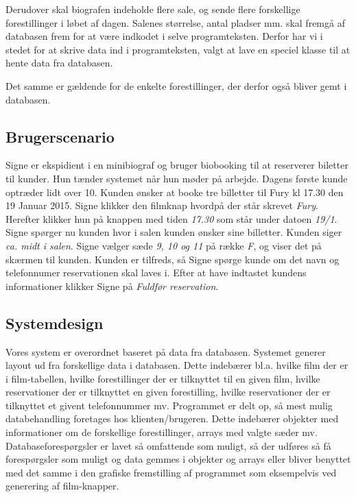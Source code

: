 \documentclass[final]{report}
\begin{document}
Derudover skal biografen indeholde flere sale, og sende flere forskellige forestillinger i løbet af dagen. Salenes størrelse, antal pladser mm. skal fremgå af databasen frem for at være indkodet i selve programteksten. Derfor har vi i stedet for at skrive data ind i programteksten, valgt at lave en speciel klasse til at hente data fra databasen. 

Det samme er gældende for de enkelte forestillinger, der derfor også bliver gemt i databasen.

\subsection{Brugerscenario}
Signe er ekspidient i en minibiograf og bruger biobooking til at reserverer biletter til kunder. Hun tænder systemet når hun møder på arbejde. Dagens første kunde optræder lidt over 10. Kunden ønsker at booke tre billetter til Fury kl 17.30 den 19 Januar 2015. Signe klikker den filmknap hvordpå der står skrevet \emph{Fury}. Herefter klikker hun på knappen med tiden \emph{17.30} som står under datoen \emph{19/1}. Signe spørger nu kunden hvor i salen kunden ønsker sine billetter. Kunden siger \emph{ca. midt i salen}. Signe vælger sæde \emph{9, 10 og 11} på række \emph{F}, og viser det på skærmen til kunden. Kunden er tilfreds, så Signe spørge kunde om det navn og telefonnumer reservationen skal laves i. Efter at have indtastet kundens informationer klikker Signe på \emph{Fuldfør reservation}. 

\subsection{Systemdesign}
Vores system er overordnet baseret på data fra databasen. Systemet generer layout ud fra forskellige data i databasen. Dette indebærer bl.a. hvilke film der er i film-tabellen, hvilke forestillinger der er tilknyttet til en given film, hvilke reservationer der er tilknyttet en given forestilling, hvilke reservationer der er tilknyttet et givent telefonnummer mv. Programmet er delt op, så mest mulig databehandling foretages hos klienten/brugeren. Dette indebærer objekter med informationer om de forskellige forestillinger, arrays med valgte sæder mv. Databaseforespørgsler er lavet så omfattende som muligt, så der udføres så få forespørgsler som muligt og data gemmes i objekter og arrays eller bliver benyttet med det samme i den grafiske fremstilling af programmet som eksempelvis ved generering af film-knapper. 
\end{document}
